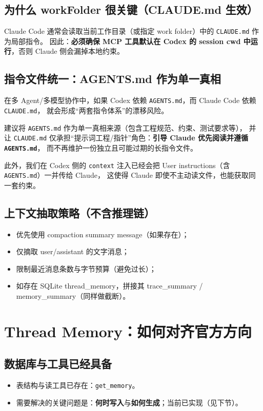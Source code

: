 \documentclass[UTF8,11pt]{ctexart}
\begin{document}
\subsection{为什么 workFolder 很关键（CLAUDE.md 生效）}
Claude Code 通常会读取当前工作目录（或指定 work folder）中的 \texttt{CLAUDE.md} 作为局部指令。
因此：\textbf{必须确保 MCP 工具默认在 Codex 的 session cwd 中运行}，否则 Claude 侧会漏掉本地约束。

\subsection{指令文件统一：AGENTS.md 作为单一真相}
在多 Agent/多模型协作中，如果 Codex 依赖 \texttt{AGENTS.md}，而 Claude Code 依赖 \texttt{CLAUDE.md}，
就会形成“两套指令体系”的漂移风险。

建议将 \texttt{AGENTS.md} 作为单一真相来源（包含工程规范、约束、测试要求等），
并让 \texttt{CLAUDE.md} 仅承担“提示词工程/指针”角色：\textbf{引导 Claude 优先阅读并遵循 \texttt{AGENTS.md}}，
而不再维护一份独立且可能过期的长指令文件。

此外，我们在 Codex 侧的 \texttt{context} 注入已经会把 User instructions（含 \texttt{AGENTS.md}）一并传给 Claude，
这使得 Claude 即使不主动读文件，也能获取同一套约束。

\subsection{上下文抽取策略（不含推理链）}
\begin{itemize}[nosep]
  \item 优先使用 compaction summary message（如果存在）；
  \item 仅摘取 user/assistant 的文字消息；
  \item 限制最近消息条数与字节预算（避免过长）；
  \item 如存在 SQLite thread\_memory，拼接其 trace\_summary / memory\_summary（同样做截断）。
\end{itemize}

\section{Thread Memory：如何对齐官方方向}
\subsection{数据库与工具已经具备}
\begin{itemize}[nosep]
  \item 表结构与读工具已存在：\texttt{get\_memory}。
  \item 需要解决的关键问题是：\textbf{何时写入}与\textbf{如何生成}；当前已实现（见下节）。
\end{itemize}
\end{document}
